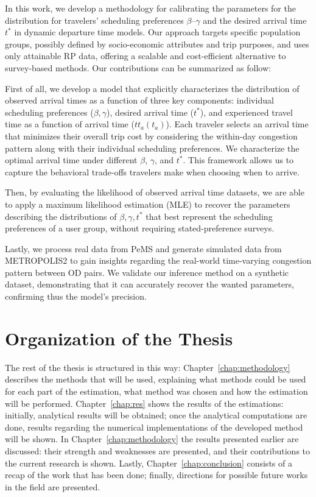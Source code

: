 In this work, we develop a methodology for calibrating the parameters for the distribution for travelers' scheduling preferences \(\beta\)–\(\gamma\) and the desired arrival time \( t^* \) in dynamic departure time models. Our approach targets specific population groups, possibly defined by socio-economic attributes and trip purposes, and uses only attainable RP data, offering a scalable and cost-efficient alternative to survey-based methods.
Our contributions can be summarized as follow:

First of all, we develop a model that explicitly characterizes the distribution of observed arrival times as a function of three key components: individual scheduling preferences (\(\beta, \gamma\)), desired arrival time (\(t^*\)), and experienced travel time as a function of arrival time (\(tt_a(t_a)\)). Each traveler selects an arrival time that minimizes their overall trip cost by considering the within-day congestion pattern along with their individual scheduling preferences. We characterize the optimal arrival time under different $\beta$, $\gamma$, and $t^*$. This framework allows us to capture the behavioral trade-offs travelers make when choosing when to arrive.

Then, by evaluating the likelihood of observed arrival time datasets, we are able to apply a maximum likelihood estimation (MLE) to recover the parameters describing the distributions of \(\beta, \gamma, t^*\) that best represent the scheduling preferences of a user group, without requiring stated-preference surveys.

Lastly, we process real data from PeMS and generate simulated data from METROPOLIS2 to gain insights regarding the real-world time-varying congestion pattern between OD pairs.  We validate our inference method on a synthetic dataset, demonstrating that it can accurately recover the wanted parameters, confirming thus the model's precision.


\section{Organization of the Thesis}
The rest of the thesis is structured in this way:
Chapter~\ref{chap:methodology} describes the methods that will be used,
explaining what methods could be used for each part of the estimation,
what method was chosen and how the estimation will be performed.
Chapter~\ref{chap:res} shows the results of the estimations:
initially, analytical results will be obtained;
once the analytical computations are done,
results regarding the numerical implementations of the developed method will be shown.
In Chapter~\ref{chap:methodology} the results presented earlier are discussed:
their strength and weaknesses are presented,
and their contributions to the current research is shown.
Lastly, Chapter~\ref{chap:conclusion} consists of a recap of the work that has been done;
finally, directions for possible future works in the field are presented.


